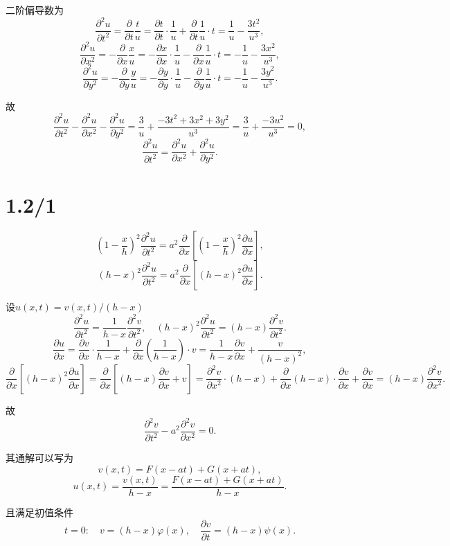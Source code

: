 \documentclass[11pt,a4paper]{article}
\begin{document}
二阶偏导数为
$$\frac{\partial^2 u}{\partial t^2}=\frac{\partial}{\partial t}\frac{t}{u}=\frac{\partial t}{\partial t}\cdot \frac{1}{u}+\frac{\partial}{\partial t}\frac{1}{u}\cdot t=\frac{1}{u}-\frac{3t^2}{u^3},$$
$$\frac{\partial^2 u}{\partial x^2}=-\frac{\partial}{\partial x}\frac{x}{u}=-\frac{\partial x}{\partial x}\cdot \frac{1}{u}-\frac{\partial}{\partial x}\frac{1}{u}\cdot t=-\frac{1}{u}-\frac{3x^2}{u^3},$$
$$\frac{\partial^2 u}{\partial y^2}=-\frac{\partial}{\partial y}\frac{y}{u}=-\frac{\partial y}{\partial y}\cdot \frac{1}{u}-\frac{\partial}{\partial y}\frac{1}{u}\cdot t=-\frac{1}{u}-\frac{3y^2}{u^3}.$$

故
$$\frac{\partial^2 u}{\partial t^2}-\frac{\partial^2 u}{\partial x^2}-\frac{\partial^2 u}{\partial y^2}=\frac{3}{u}+\frac{-3t^2+3x^2+3y^2}{u^3}=\frac{3}{u}+\frac{-3u^2}{u^3}=0,$$
$$\frac{\partial^2 u}{\partial t^2}=\frac{\partial^2 u}{\partial x^2}+\frac{\partial^2 u}{\partial y^2}.$$

\section{1.2/1}

$$\left(1-\frac{x}{h}\right)^2\frac{\partial^2 u}{\partial t^2}=a^2\frac{\partial}{\partial x}\left[\left(1-\frac{x}{h}\right)^2\frac{\partial u}{\partial x}\right],$$
$$(h-x)^2\frac{\partial^2 u}{\partial t^2}=a^2\frac{\partial}{\partial x}\left[(h-x)^2\frac{\partial u}{\partial x}\right].$$

设$u(x,t)=v(x,t)/(h-x)$
$$\frac{\partial^2 u}{\partial t^2}=\frac{1}{h-x}\frac{\partial^2 v}{\partial t^2},\quad (h-x)^2\frac{\partial^2 u}{\partial t^2}=(h-x)\frac{\partial^2 v}{\partial t^2}.$$
$$\frac{\partial u}{\partial x}=\frac{\partial v}{\partial x}\cdot\frac{1}{h-x}+\frac{\partial}{\partial x}\left(\frac{1}{h-x}\right)\cdot v=\frac{1}{h-x}\frac{\partial v}{\partial x}+\frac{v}{(h-x)^2},$$
$$\frac{\partial}{\partial x}\left[(h-x)^2\frac{\partial u}{\partial x}\right]=\frac{\partial}{\partial x}\left[(h-x)\frac{\partial v}{\partial x}+v\right]=
\frac{\partial^2 v}{\partial x^2}\cdot(h-x)+\frac{\partial}{\partial x}(h-x)\cdot\frac{\partial v}{\partial x}+\frac{\partial v}{\partial x}=(h-x)\frac{\partial^2 v}{\partial x^2}.$$

故
$$\frac{\partial^2 v}{\partial t^2}-a^2\frac{\partial^2 v}{\partial x^2}=0.$$

其通解可以写为
$$v(x,t)=F(x-at)+G(x+at),$$
$$u(x,t)=\frac{v(x,t)}{h-x}=\frac{F(x-at)+G(x+at)}{h-x}.$$

且满足初值条件
$$t=0:\quad v=(h-x)\varphi(x),\quad \frac{\partial v}{\partial t}=(h-x)\psi(x).$$
\end{document}
